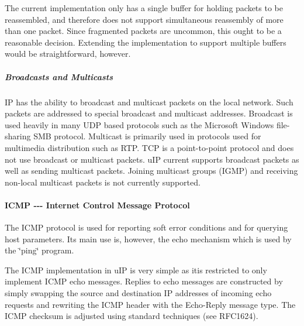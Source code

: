 The current implementation only has a single buffer for holding packets to be reassembled, and therefore does not support simultaneous reassembly of more than one packet. Since fragmented packets are uncommon, this ought to be a reasonable decision. Extending the implementation to support multiple buffers would be straightforward, however.\hypertarget{a00074_ipbroadcast}{}\subparagraph{Broadcasts and Multicasts}\label{a00074_ipbroadcast}
IP has the ability to broadcast and multicast packets on the local network. Such packets are addressed to special broadcast and multicast addresses. Broadcast is used heavily in many U\+DP based protocols such as the Microsoft Windows file-\/sharing S\+MB protocol. Multicast is primarily used in protocols used for multimedia distribution such as R\+TP. T\+CP is a point-\/to-\/point protocol and does not use broadcast or multicast packets. u\+IP current supports broadcast packets as well as sending multicast packets. Joining multicast groups (I\+G\+MP) and receiving non-\/local multicast packets is not currently supported.\hypertarget{a00074_icmp}{}\paragraph{I\+C\+M\+P -\/-\/-\/ Internet Control Message Protocol}\label{a00074_icmp}
The I\+C\+MP protocol is used for reporting soft error conditions and for querying host parameters. Its main use is, however, the echo mechanism which is used by the \char`\"{}ping\char`\"{} program.

The I\+C\+MP implementation in u\+IP is very simple as itis restricted to only implement I\+C\+MP echo messages. Replies to echo messages are constructed by simply swapping the source and destination IP addresses of incoming echo requests and rewriting the I\+C\+MP header with the Echo-\/\+Reply message type. The I\+C\+MP checksum is adjusted using standard techniques (see R\+F\+C1624).

